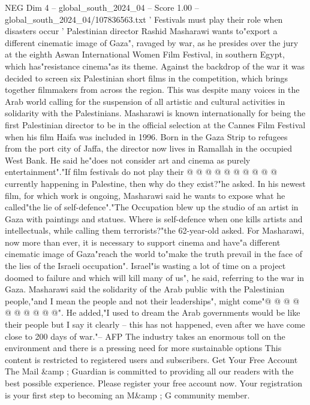 \begin{textsample}{NEG Dim 4 – global\_south\_2024\_04 – Score 1.00 – global\_south\_2024\_04/107836563.txt}  \label{ex:f4_neg_197}
' Festivals must play their role when disasters occur ' Palestinian director Rashid Masharawi wants to"export a different cinematic image of Gaza", ravaged by war, as he presides over the jury at the eighth Aswan International Women Film Festival, in southern Egypt, which has"resistance cinema"as its theme.
Against the backdrop of the war it was decided to screen six Palestinian short films in the competition, which brings together filmmakers from across the region.
This was despite many voices in the Arab world calling for the suspension of all artistic and cultural activities in solidarity with the Palestinians.
Masharawi is known internationally for being the first Palestinian director to be in the official selection at the Cannes Film Festival when his film Haifa was included in 1996.
Born in the Gaza Strip to refugees from the port city of Jaffa, the director now lives in Ramallah in the occupied West Bank.
He said he"does not consider art and cinema as purely entertainment"."If film festivals do not play their @ @ @ @ @ @ @ @ @ @ currently happening in Palestine, then why do they exist?"he asked.
In his newest film, for which work is ongoing, Masharawi said he wants to expose what he called"the lie of self-defence"."The Occupation blew up the studio of an artist in Gaza with paintings and statues.
Where is self-defence when one kills artists and intellectuals, while calling them terrorists?"the 62-year-old asked.
For Masharawi, now more than ever, it is necessary to support cinema and have"a different cinematic image of Gaza"reach the world to"make the truth prevail in the face of the lies of the Israeli occupation".
Israel"is wasting a lot of time on a project doomed to failure and which will kill many of us", he said, referring to the war in Gaza.
Masharawi said the solidarity of the Arab public with the Palestinian people,"and I mean the people and not their leaderships", might come"@ @ @ @ @ @ @ @ @ @".
He added,"I used to dream the Arab governments would be like their people but I say it clearly -- this has not happened, even after we have come close to 200 days of war."-- AFP The industry takes an enormous toll on the environment and there is a pressing need for more sustainable options This content is restricted to registered users and subscribers.
Get Your Free Account The Mail \&amp ; Guardian is committed to providing all our readers with the best possible experience.
Please register your free account now.
Your registration is your first step to becoming an M\&amp ; G community member.

\end{textsample}
